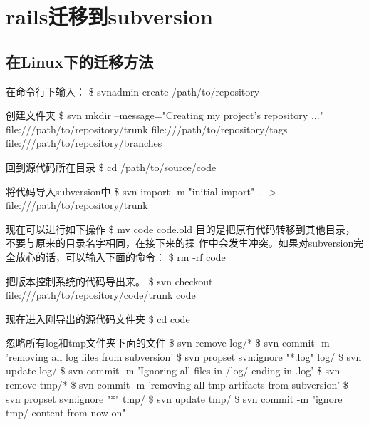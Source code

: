 
\chapter{rails迁移到subversion}

\section{在Linux下的迁移方法}
在命令行下输入：
\$ svnadmin create /path/to/repository

创建文件夹
\$ svn mkdir --message="Creating my project's repository ..."
file:///path/to/repository/trunk file:///path/to/repository/tags
file:///path/to/repository/branches

回到源代码所在目录
\$ cd /path/to/source/code

将代码导入subversion中
\$ svn import -m "initial import" . \
> file:///path/to/repository/trunk

现在可以进行如下操作
\$ mv code code.old
目的是把原有代码转移到其他目录，不要与原来的目录名字相同，在接下来的操
作中会发生冲突。如果对subversion完全放心的话，可以输入下面的命令：
\$ rm -rf code

把版本控制系统的代码导出来。
\$ svn checkout file:///path/to/repository/code/trunk code

现在进入刚导出的源代码文件夹
\$ cd code

忽略所有log和tmp文件夹下面的文件
\$ svn remove log/*
\$ svn commit -m 'removing all log files from subversion'
\$ svn propset svn:ignore "*.log" log/
\$ svn update log/
\$ svn commit -m 'Ignoring all files in /log/ ending in .log'
\$ svn remove tmp/*
\$ svn commit -m 'removing all tmp artifacts from subversion'
\$ svn propset svn:ignore "*" tmp/
\$ svn update tmp/
\$ svn commit -m "ignore tmp/ content from now on" 




